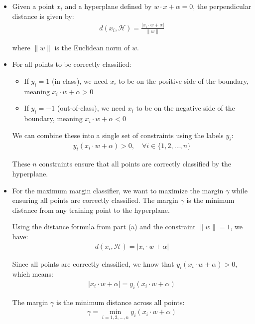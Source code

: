 \begin{itemize}
\item[(a)] 

Given a point $x_i$ and a hyperplane defined by $w \cdot x + \alpha = 0$, the perpendicular distance is given by:
\begin{align*}
d(x_i, \mathcal{H}) = \frac{|x_i \cdot w + \alpha|}{\|w\|}
\end{align*}

where $\|w\|$ is the Euclidean norm of $w$.
\item[(b)] For all points to be correctly classified:
\begin{itemize}
\item If $y_i = 1$ (in-class), we need $x_i$ to be on the positive side of the boundary, meaning $x_i \cdot w + \alpha > 0$
\item If $y_i = -1$ (out-of-class), we need $x_i$ to be on the negative side of the boundary, meaning $x_i \cdot w + \alpha < 0$
\end{itemize}

We can combine these into a single set of constraints using the labels $y_i$:
\begin{align*}
y_i(x_i \cdot w + \alpha) > 0, \quad \forall i \in \{1, 2, ..., n\}
\end{align*}

These $n$ constraints ensure that all points are correctly classified by the hyperplane.

\item[(c)] For the maximum margin classifier, we want to maximize the margin $\gamma$ while ensuring all points are correctly classified. The margin $\gamma$ is the minimum distance from any training point to the hyperplane.

Using the distance formula from part (a) and the constraint $\|w\| = 1$, we have:
\begin{align*}
d(x_i, \mathcal{H}) = |x_i \cdot w + \alpha|
\end{align*}

Since all points are correctly classified, we know that $y_i(x_i \cdot w + \alpha) > 0$, which means:
\begin{align*}
|x_i \cdot w + \alpha| = y_i(x_i \cdot w + \alpha)
\end{align*}

The margin $\gamma$ is the minimum distance across all points:
\begin{align*}
\gamma = \min_{i=1,2,...,n} y_i(x_i \cdot w + \alpha)
\end{align*}


\end{itemize}
